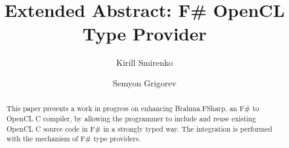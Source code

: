 \documentclass[sigplan,review]{acmart}\settopmatter{printfolios=true}
\begin{document}
\title[]{Extended Abstract: F\# OpenCL Type Provider}         %



\author{Kirill Smirenko}


\author{Semyon Grigorev}


\begin{abstract}
This paper presents a work in progress on enhancing Brahma.FSharp, an F\# to OpenCL C compiler, by allowing the programmer to include and reuse existing OpenCL C source code in F\# in a strongly typed way. The integration is performed with the mechanism of F\# type providers.
\end{abstract}
\end{document}
